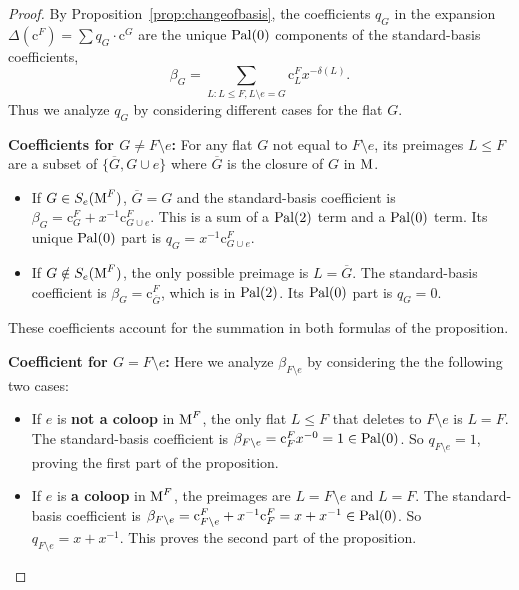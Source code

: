 \documentclass[11pt]{article}
\newcommand{\M}{\normalfont\text{M}}
\newcommand{\Cbasis}[1]{\mathrm{c}^{#1}}
\newcommand{\CbasisSub}[2]{\mathrm{c}^{#1}_{#2}}
\newcommand{\pal}{\normalfont\text{Pal}}
\theoremstyle{remark}
\begin{document}
\begin{proof}
    By Proposition~\ref{prop:changeofbasis}, the coefficients
    \(q_G\) in the expansion \(\Delta(\Cbasis{F}) = \sum q_G \cdot \Cbasis{G}\) are the unique \(\pal(0)\)
    components of the standard-basis coefficients,
    \[\beta_G = \sum_{L: L \le F, L\setminus e = G} \CbasisSub{F}{L} x^{-\delta(L)}.\]
    Thus we analyze
    \(q_G\) by considering different cases for the flat \(G\).

    \textbf{Coefficients for \(G \neq F \setminus e\):}
    For any flat \(G\) not equal to \(F \setminus e\), its preimages \(L \le F\) are a subset of
    \(\{\overline{G}, G \cup e\}\) where \(\overline{G}\) is the closure of \(G\) in \(\M\).
    \begin{itemize}
        \item If \(G \in S_e(\M^F)\), \(\overline{G} = G\) and the standard-basis coefficient is \(\beta_G = \CbasisSub{F}{G} + x^{-1}\CbasisSub{F}{G\cup e}\). This is a sum of a \(\pal(2)\) term and a \(\pal(0)\) term. Its unique \(\pal(0)\) part is \(q_G = x^{-1}\CbasisSub{F}{G\cup e}\).
        \item If \(G \notin S_e(\M^F)\), the only possible preimage is
              \(L=\overline{G}\). The standard-basis coefficient is
              \(\beta_G = \CbasisSub{F}{\overline{G}}\), which is in \(\pal(2)\). Its \(\pal(0)\) part is \(q_G = 0\).
    \end{itemize}
    These coefficients account for the summation in both formulas of the proposition.

    \textbf{Coefficient for \(G = F \setminus e\):}
    Here we analyze \(\beta_{F\setminus e}\) by considering the the following two cases:
    \begin{itemize}
        \item If \(e\) is \textbf{not a coloop} in \(\M^F\), the only flat \(L \le F\) that deletes to
              \(F \setminus e\) is \(L=F\). The standard-basis coefficient is \(\beta_{F\setminus e} =
              \CbasisSub{F}{F}x^{-0} = 1 \in \pal(0)\).
              So \(q_{F\setminus e} = 1\), proving the first part of the proposition.

        \item If \(e\) is \textbf{a coloop} in \(\M^F\), the preimages are \(L=F \setminus e\) and
              \(L=F\). The standard-basis coefficient is
              \(\beta_{F\setminus e} = \CbasisSub{F}{F\setminus e} + x^{-1}\CbasisSub{F}{F} = x+x^{-1}\in \pal(0)\).
              So \(q_{F\setminus e} = x+x^{-1}\). This proves the second part of the proposition.
    \end{itemize}
\end{proof}
\end{document}
